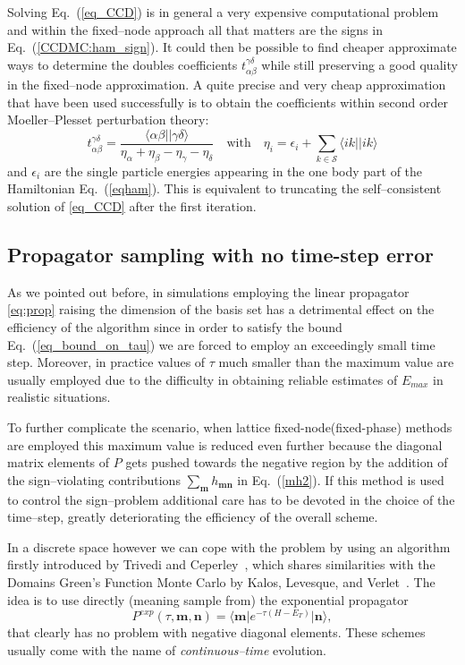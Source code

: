 Solving Eq.~(\eqref{eq_CCD}) is in general a very expensive computational problem and within 
the fixed--node approach all that matters are the signs in Eq.~(\eqref{CCDMC:ham_sign}). It could 
then be possible to find cheaper approximate ways to determine the doubles coefficients $t_{\alpha\beta}^{\gamma\delta}$ 
while still preserving a good quality in the fixed--node approximation. A quite precise and very
cheap approximation that have been used successfully is to obtain the coefficients within second 
order Moeller--Plesset perturbation theory:
\begin{equation}
t_{\alpha\beta}^{\gamma\delta} = \frac{\langle \alpha\beta\lvert\rvert \gamma\delta\rangle }{\eta_\alpha+\eta_\beta-\eta_\gamma-\eta_\delta} \quad  \text{with} \quad \eta_i=\epsilon_i+\sum_{k\in\mathcal{S}} \langle ik\lvert\rvert ik\rangle
\end{equation}
and $\epsilon_i$ are the single particle energies appearing in the one body part of the Hamiltonian Eq.~(\eqref{eqham}).
This is equivalent to truncating the self--consistent solution of \eqref{eq_CCD} after the first iteration.

\subsection{Propagator sampling with no time-step error}
\label{sec:expprop}
As we pointed out before, in simulations employing the linear propagator \eqref{eq:prop} raising the dimension of the basis set has a detrimental effect on the efficiency 
of the algorithm since in order to satisfy the bound Eq.~(\eqref{eq_bound_on_tau}) we are forced to employ
an exceedingly small time step. Moreover, in practice values of $\tau$ much smaller than the
maximum value are usually employed due to the difficulty in obtaining reliable estimates of $E_{max}$ in realistic situations.

To further complicate the scenario, when lattice fixed-node(fixed-phase) methods are employed this maximum value is reduced even further because the diagonal
matrix elements of $P$ gets pushed towards the negative region by the addition of the sign--violating contributions $\sum_{\mathbf{m}} h_{\mathbf{m}\mathbf{n}}$ in Eq.~(\eqref{mh2}). 
If this method is used to control the sign--problem additional care has to be devoted in the choice of the time--step, greatly deteriorating the efficiency of the overall scheme.

In a discrete space however we can cope with the problem by using an algorithm firstly introduced by Trivedi and Ceperley~\cite{Trivedi90}, which shares 
similarities with the Domains Green's Function Monte Carlo by Kalos, Levesque, and Verlet~\cite{Kalos74}. The idea is to use directly (meaning sample from) the exponential propagator
\begin{equation}
\label{exp_prop}
P^{exp}(\tau,\mathbf{m},\mathbf{n}) = \langle \mathbf{m} \lvert e^{-\tau(H - E_T)} \rvert \mathbf{n}  \rangle,
\end{equation}
that clearly has no problem with negative diagonal elements. These schemes usually come with the name of {\it continuous--time} evolution.

